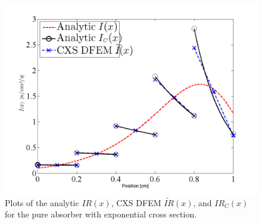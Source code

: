 \begin{figure}[!htp]
\centering
\includegraphics[width=12cm]{chapter3_variable_xs/I_Blades.png}
\caption{Plots of the analytic $IR(x)$, CXS DFEM $\widetilde{IR}(x)$, and  $IR_C(x)$ for the pure absorber with exponential cross section.}
\label{fig:cxs_blades_ir}
\end{figure}

